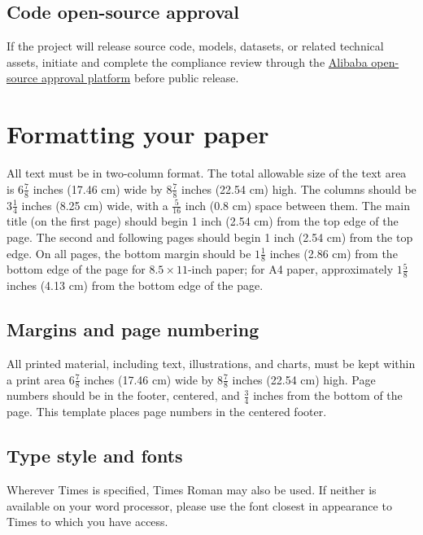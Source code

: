 \documentclass[10pt,twocolumn,letterpaper]{article}
\begin{document}
\subsection{Code open-source approval}

If the project will release source code, models, datasets, or related technical assets, initiate and complete the compliance review through the \href{https://lc.alibaba-inc.com/\#/lc/home?survey=1}{Alibaba open-source approval platform} before public release.

\section{Formatting your paper}
\label{sec:formatting}

All text must be in two-column format.
The total allowable size of the text area is $6\frac78$ inches (17.46 cm) wide by $8\frac78$ inches (22.54 cm) high.
The columns should be $3\frac14$ inches (8.25 cm) wide, with a $\frac{5}{16}$ inch (0.8 cm) space between them.
The main title (on the first page) should begin 1 inch (2.54 cm) from the top edge of the page.
The second and following pages should begin 1 inch (2.54 cm) from the top edge.
On all pages, the bottom margin should be $1\frac{1}{8}$ inches (2.86 cm) from the bottom edge of the page for $8.5 \times 11$-inch paper;
for A4 paper, approximately $1\frac{5}{8}$ inches (4.13 cm) from the bottom edge of the
page.

\subsection{Margins and page numbering}

All printed material, including text, illustrations, and charts, must be kept
within a print area $6\frac{7}{8}$ inches (17.46 cm) wide by $8\frac{7}{8}$ inches (22.54 cm)
high.
%
Page numbers should be in the footer, centered, and $\frac{3}{4}$ inches from the bottom of the page.
This template places page numbers in the centered footer.



\subsection{Type style and fonts}

Wherever Times is specified, Times Roman may also be used.
If neither is available on your word processor, please use the font closest in
appearance to Times to which you have access.
\end{document}
